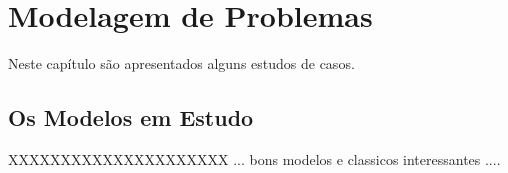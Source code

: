 
\chapter{Modelagem de Problemas}
\label{cp:mp}


Neste capítulo são apresentados alguns estudos de casos.

\section{Os Modelos em Estudo}

XXXXXXXXXXXXXXXXXXXXX ... bons modelos e classicos  interessantes ....




